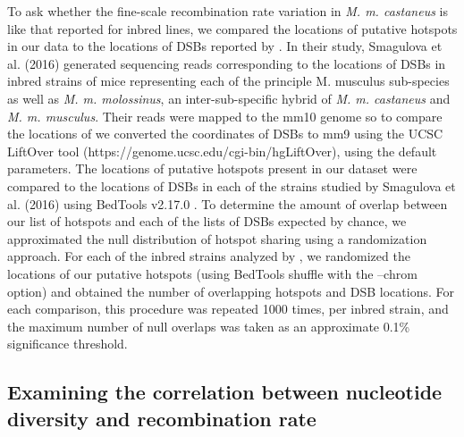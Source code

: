 	To ask whether the fine-scale recombination rate variation in \emph{M. m. castaneus} is like that reported for inbred lines, we compared the locations of putative hotspots in our data to the locations of DSBs reported by \cite{RN249}. In their study, Smagulova et al. (2016) generated sequencing reads corresponding to the locations of DSBs in inbred strains of mice representing each of the principle M. musculus sub-species as well as \emph{M. m. molossinus}, an inter-sub-specific hybrid of \emph{M. m. castaneus} and \emph{M. m. musculus}. Their reads were mapped to the mm10 genome so to compare the locations of we converted the coordinates of DSBs to mm9 using the UCSC LiftOver tool (https://genome.ucsc.edu/cgi-bin/hgLiftOver), using the default parameters. The locations of putative hotspots present in our dataset were compared to the locations of DSBs in each of the strains studied by Smagulova et al. (2016) using BedTools v2.17.0 \cite{RN279}. To determine the amount of overlap between our list of hotspots and each of the lists of DSBs expected by chance, we approximated the null distribution of hotspot sharing using a randomization approach. For each of the inbred strains analyzed by \cite{RN249}, we randomized the locations of our putative hotspots (using BedTools shuffle with the –chrom option) and obtained the number of overlapping hotspots and DSB locations. For each comparison, this procedure was repeated 1000 times, per inbred strain, and the maximum number of null overlaps was taken as an approximate 0.1\% significance threshold.
 
\subsection{Examining the correlation between nucleotide diversity and recombination rate}

